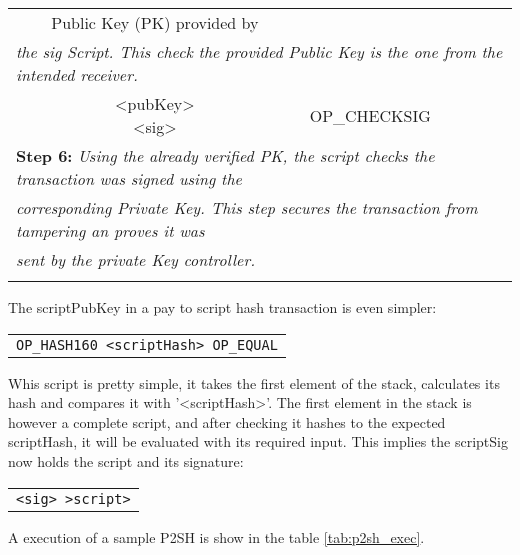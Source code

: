 \begin{table}[tbp]
\begin{tabularx}{\textwidth}{| c | X |}
{{          Public Key (PK) provided by}} \\
	  \multicolumn{2}{|l|}{\textit{the sig Script. This check the provided %
	      Public Key is the one from the intended receiver.}} \\
	\hline
	  \makecell{<pubKey> \\ <sig>} & OP\_CHECKSIG \\
	\hline
	  \multicolumn{2}{|l|}{\textbf{Step 6: }\textit{%
	      Using the already verified PK, the script checks the transaction was %
          signed using the}} \\
	  \multicolumn{2}{|l|}{\textit{corresponding Private Key. This step %
	      secures the transaction from tampering an proves it was}} \\
	  \multicolumn{2}{|l|}{\textit{sent by the private Key controller.}} \\
	\hline
	  \makecell{True} & \\
	\hline
    \end{tabularx}
\end{table}

The scriptPubKey in a pay to script hash transaction is even simpler:
\begin{center}
	\begin{tabular}{|c|}
		\texttt{OP\_HASH160 <scriptHash> OP\_EQUAL}
	\end{tabular}
\end{center}
Whis script is pretty simple, it takes the first element of the stack,
  calculates its hash and compares it with '<scriptHash>'. The first
  element in the stack is however a complete script, and after checking
  it hashes to the expected scriptHash, it will be evaluated with its
  required input. This implies the scriptSig now holds the script and
  its signature:

\begin{center}
	\begin{tabular}{|c|}
		\texttt{<sig> >script>}
	\end{tabular}
\end{center}


  A execution of a sample P2SH is show in the table \ref{tab:p2sh_exec}.

